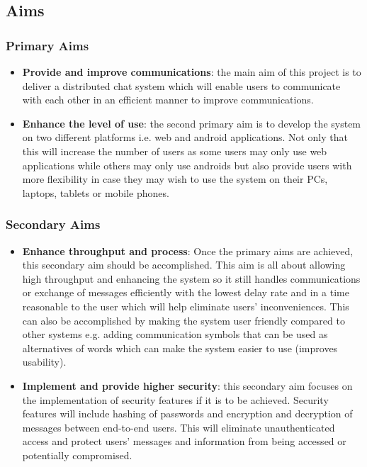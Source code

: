 \documentclass{article}
\begin{document}
\subsection{Aims}

   \subsubsection {Primary Aims}
   \begin{itemize}
     \item \textbf{Provide and improve communications}: the main aim of this project is to deliver a distributed chat system which will enable users to communicate with each other in an efficient manner to improve communications. 
     \item \textbf{Enhance the level of use}: the second primary aim is to develop the system on two different platforms i.e. web and android applications. Not only that this will increase the number of users as some users may only use web applications while others may only use androids but also provide users with more flexibility in case they may wish to use the system on their PCs, laptops, tablets or mobile phones. 
   \end{itemize}
   
   \subsubsection {Secondary Aims}
   \begin{itemize}
     \item \textbf {Enhance throughput and process}: Once the primary aims are achieved, this secondary aim should be accomplished. This aim is all about allowing high throughput and enhancing the system so it still handles communications or exchange of messages efficiently with the lowest delay rate and in a time reasonable to the user which will help eliminate users’ inconveniences. This can also be accomplished by making the system user friendly compared to other systems e.g. adding communication symbols that can be used as alternatives of words which can make the system easier to use (improves usability). 
     \item \textbf {Implement and provide higher security}: this secondary aim focuses on the implementation of security features if it is to be achieved. Security features will include hashing of passwords and encryption and decryption of messages between end-to-end users. This will eliminate unauthenticated access and protect users’ messages and information from being accessed or potentially compromised. 
   \end{itemize}
   
\end{document}
